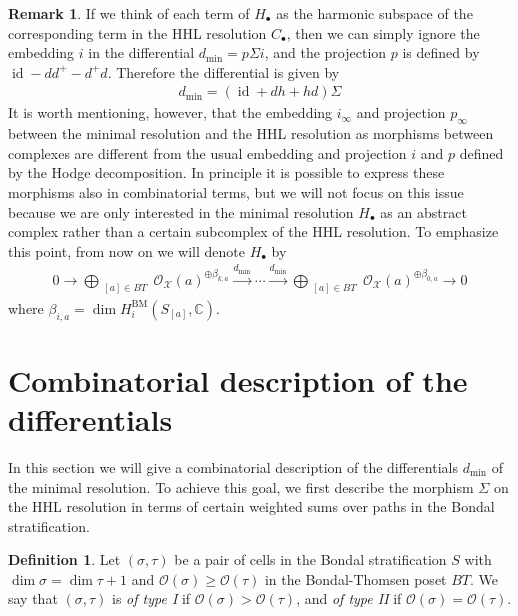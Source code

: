 \documentclass[11pt,reqno]{amsart}
\def\id {{\operatorname{id}}}
\def\C {{\mathbb C}}
\theoremstyle{definition}
\newtheorem{definition}[theorem]{Definition}
\newtheorem{remark}[theorem]{Remark}
\numberwithin{equation}{section}
\begin{document}
\smallskip



\begin{remark}\label{rmk-projection-onto-harmonic}
    If we think of each term of $H_{\bullet}$ as the harmonic subspace of the corresponding term in the HHL resolution $C_{\bullet}$, then we can simply ignore the embedding $i$ in the differential $d_{\min}=p\Sigma i$, and the projection $p$ is defined by $\id - dd^+ - d^+ d$. Therefore the differential is given by 
    \begin{align*}
        d_{\min} = (\id + dh + h d)\Sigma
    \end{align*}
    It is worth mentioning, however, that the embedding $i_{\infty}$ and projection $p_{\infty}$ between the minimal resolution and the HHL resolution as morphisms between complexes are different from the usual embedding and projection $i$ and $p$ defined by the Hodge decomposition. In principle it is possible to express these morphisms also in combinatorial terms, but we will not focus on this issue because we are only interested in the minimal resolution $H_{\bullet}$ as an abstract complex rather than a certain subcomplex of the HHL resolution. To emphasize this point, from now on we will denote $H_{\bullet}$ by 
    \begin{align*}
    0\rightarrow\bigoplus_{\substack{[a]\in BT }} \mathcal{O}_{\mathcal{X}}(a)^{\oplus\beta_{k,a}} \xrightarrow{d_{\min}} \cdots  \xrightarrow{d_{\min}} \bigoplus_{\substack{[a]\in BT }} \mathcal{O}_{\mathcal{X}}(a)^{\oplus\beta_{0,a}}\rightarrow0
\end{align*}
where $\beta_{i,a} = \dim H^{\mathrm{BM}}_{i}(S_{[a]},\C)$.
\end{remark}






\section{Combinatorial description of the differentials}\label{sec:differentials}

In this section we will give a combinatorial description of the differentials $d_{\min}$ of the minimal resolution. To achieve this goal, we first describe the morphism $\Sigma$ on the HHL resolution in terms of certain weighted sums over paths in the Bondal stratification.

\smallskip

\begin{definition}
    Let $(\sigma,\tau)$ be a pair of cells in the Bondal stratification $S$ with $\dim\sigma = \dim\tau + 1$ and $\mathcal{O}(\sigma)\geq \mathcal{O}(\tau)$ in the Bondal-Thomsen poset $BT$. We say that $(\sigma,\tau)$ is \textit{of type I} if $\mathcal{O}(\sigma)> \mathcal{O}(\tau)$, and \textit{of type II} if $\mathcal{O}(\sigma)= \mathcal{O}(\tau)$.
\end{definition}
\end{document}
